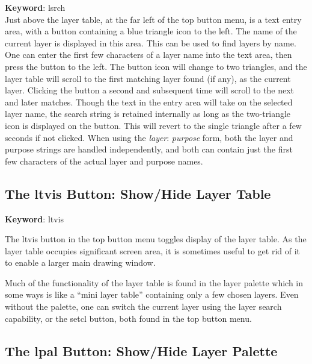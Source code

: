 {\bf Keyword}: {\vt lsrch}\\

Just above the layer table, at the far left of the top button menu, is
a text entry area, with a button containing a blue triangle icon to
the left.  The name of the current layer is displayed in this area. 
This can be used to find layers by name.  One can enter the first few
characters of a layer name into the text area, then press the button
to the left.  The button icon will change to two triangles, and the
layer table will scroll to the first matching layer found (if any), as
the current layer.  Clicking the button a second and subsequent time
will scroll to the next and later matches.  Though the text in the
entry area will take on the selected layer name, the search string is
retained internally as long as the two-triangle icon is displayed on
the button.  This will revert to the single triangle after a few
seconds if not clicked.  When using the {\it layer\/}{\vt :}{\it
purpose} form, both the layer and purpose strings are handled
independently, and both can contain just the first few characters of
the actual layer and purpose names.

\subsection{The {\cb ltvis} Button: Show/Hide Layer Table}

{\bf Keyword}: {\vt ltvis}

The {\cb ltvis} button in the top button menu toggles display of the
layer table.  As the layer table occupies significant screen area, it
is sometimes useful to get rid of it to enable a larger main drawing
window.

Much of the functionality of the layer table is found in the layer
palette which in some ways is like a ``mini layer table'' containing
only a few chosen layers.  Even without the palette, one can switch
the current layer using the layer search capability, or the {\cb
setcl} button, both found in the top button menu.

\subsection{The lpal Button: Show/Hide Layer Palette}

